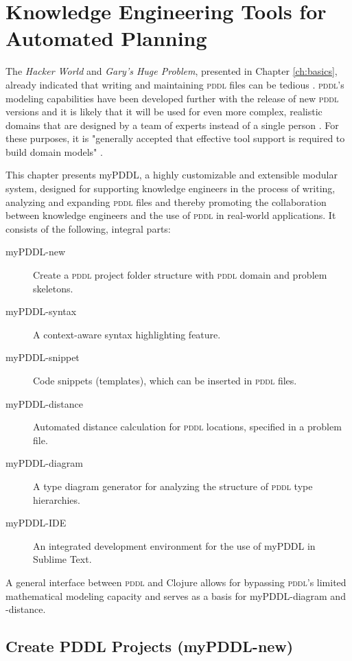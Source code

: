 \documentclass[a4paper,12pt]{report}
\newcommand{\mypddl}{\smallerft[0.8]{myPDDL}\xspace}
\newcommand{\pddl}{\textsc{pddl}\xspace}
\newcommand\smallerft[2][0.85]{{\scalefont{#1}#2}}
\begin{document}
\chapter{Knowledge Engineering Tools for Automated Planning}
\label{sec-4}
\label{ch:tools}

The \emph{Hacker World} and \emph{Gary's Huge Problem}, presented in Chapter
\ref{ch:basics}, already indicated that writing and maintaining \pddl files
can be tedious \cite{li2012translating,zhuo2010learning}. \pddl's
modeling capabilities have been developed further with the release of
new \pddl versions \cite{fox2003pddl2,kovacs2011bnf} and it is likely
that it will be used for even more complex, realistic domains that are
designed by a team of experts instead of a single person
\cite{shah2013knowledge}. For these purposes, it is "generally
accepted that effective tool support is required to build domain
models" \cite[][p.53]{shah2013knowledge}.

This chapter presents \mypddl, a highly customizable
and extensible modular system, designed for supporting knowledge
engineers in the process of writing, analyzing and expanding \pddl
files and thereby promoting the collaboration between knowledge
engineers and the use of \pddl in real-world applications. 
It consists of the following, integral parts:

\begin{description}
\item[{\mypddl-new}] Create a \pddl project folder structure with \pddl
                 domain and problem skeletons.
\item[{\mypddl-syntax}] A context-aware syntax highlighting feature.
\item[{\mypddl-snippet}] Code snippets (templates), which can be inserted
in \pddl files.
\item[{\mypddl-distance}] Automated distance calculation for \pddl
     locations, specified in a problem file.
\item[{\mypddl-diagram}] A type diagram generator for analyzing the
structure of \pddl type hierarchies.
\item[{\mypddl-IDE}] An integrated development environment for the use of
\mypddl in Sublime Text.
\end{description}

A general interface between \pddl and Clojure allows for bypassing
\pddl's limited mathematical modeling capacity and serves as a basis
for \mypddl-diagram and -distance.


\section{Create PDDL Projects (myPDDL-new)}
\label{sec-4-1}
\end{document}
